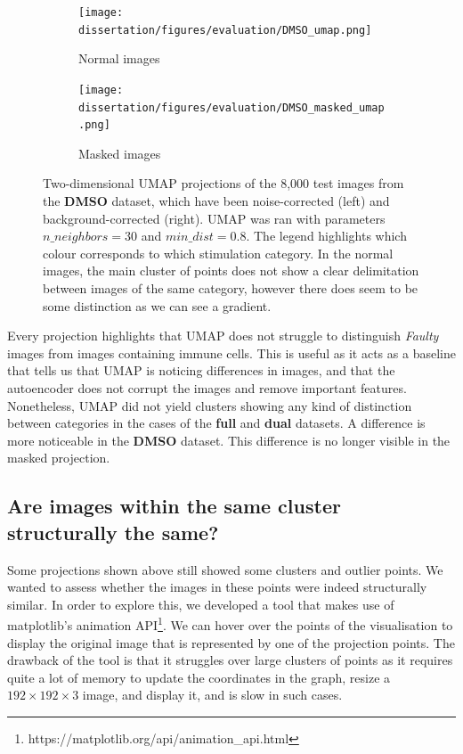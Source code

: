 \begin{figure}[h!]
    \centering
    \begin{subfigure}[h!]{0.45\textwidth}
        \texttt{[image: dissertation/figures/evaluation/DMSO\_umap.png]}
        \caption{Normal images}
    \end{subfigure}
    \begin{subfigure}[h!]{0.45\textwidth}
        \texttt{[image: dissertation/figures/evaluation/DMSO\_masked\_umap.png]}
        \caption{Masked images}
    \end{subfigure}
    \caption{Two-dimensional UMAP projections of the 8,000 test images from the \textbf{DMSO} dataset, which have been noise-corrected (left) and background-corrected (right). UMAP was ran with parameters $n\_neighbors=30$ and $min\_dist=0.8$. The legend highlights which colour corresponds to which stimulation category. In the normal images, the main cluster of points does not show a clear delimitation between images of the same category, however there does seem to be some distinction as we can see a gradient.}
    \label{fig:dmso_projection}
\end{figure}

Every projection highlights that UMAP does not struggle to distinguish \textit{Faulty} images from images containing immune cells. This is useful as it acts as a baseline that tells us that UMAP is noticing differences in images, and that the autoencoder does not corrupt the images and remove important features. Nonetheless, UMAP did not yield clusters showing any kind of distinction between categories in the cases of the \textbf{full} and \textbf{dual} datasets. A difference is more noticeable in the \textbf{DMSO} dataset. This difference is no longer visible in the masked projection. %

\subsection{Are images within the same cluster structurally the same?}

Some projections shown above still showed some clusters and outlier points. We wanted to assess whether the images in these points were indeed structurally similar. In order to explore this, we developed a tool that makes use of matplotlib's animation API\footnote{https://matplotlib.org/api/animation\_api.html}. We can hover over the points of the visualisation to display the original image that is represented by one of the projection points. The drawback of the tool is that it struggles over large clusters of points as it requires quite a lot of memory to update the coordinates in the graph, resize a $192\times192\times3$ image, and display it, and is slow in such cases.

